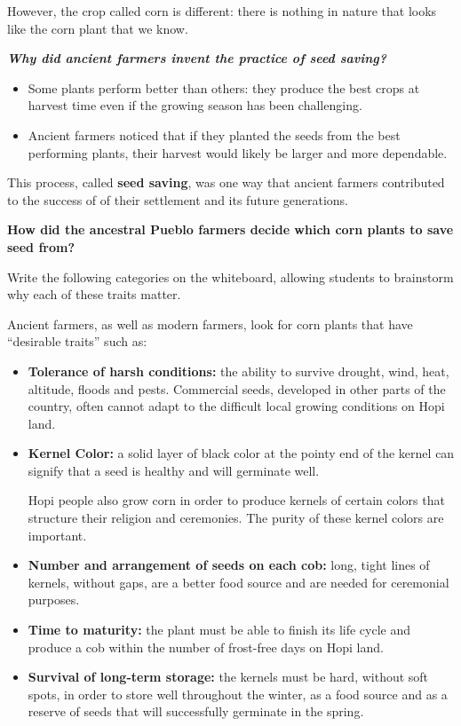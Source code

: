 \documentclass[12pt,]{article}
\providecommand{\tightlist}{%
  \setlength{\itemsep}{0pt}\setlength{\parskip}{0pt}}
\begin{document}
However, the crop called corn is different: there is nothing in nature that looks like the corn plant that we know.

\textbf{\emph{Why did ancient farmers invent the practice of seed saving?} }

\begin{itemize}
\tightlist
\item
  Some plants perform better than others: they produce the best crops at harvest time even if the growing season has been challenging.
\item
  Ancient farmers noticed that if they planted the seeds from the best performing plants, their harvest would likely be larger and more dependable.
\end{itemize}

This process, called \textbf{seed saving}, was one way that ancient farmers contributed to the success of of their settlement and its future generations.

\textbf{How did the ancestral Pueblo farmers decide which corn plants to save seed from? }

Write the following categories on the whiteboard, allowing students to brainstorm why each of these traits matter.

Ancient farmers, as well as modern farmers, look for corn plants that have ``desirable traits'' such as:

\begin{itemize}
\item
  \textbf{Tolerance of harsh conditions:} the ability to survive drought, wind, heat, altitude, floods and pests. Commercial seeds, developed in other parts of the country, often cannot adapt to the difficult local growing conditions on Hopi land.
\item
  \textbf{Kernel Color:} a solid layer of black color at the pointy end of the kernel can signify that a seed is healthy and will germinate well.

  Hopi people also grow corn in order to produce kernels of certain colors that structure their religion and ceremonies. The purity of these kernel colors are important.
\item
  \textbf{Number and arrangement of seeds on each cob: }long, tight lines of kernels, without gaps, are a better food source and are needed for ceremonial purposes.
\item
  \textbf{Time to maturity:} the plant must be able to finish its life cycle and produce a cob within the number of frost-free days on Hopi land.\\
\item
  \textbf{Survival of long-term storage: }the kernels must be hard, without soft spots, in order to store well throughout the winter, as a food source and as a reserve of seeds that will successfully germinate in the spring.
\end{itemize}
\end{document}
